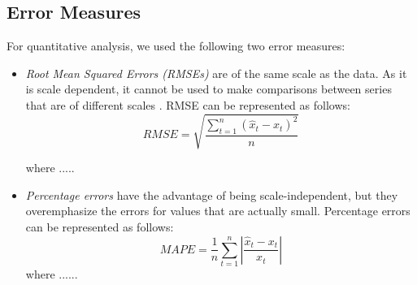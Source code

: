 \subsection{Error Measures}
For quantitative analysis, we used the following two error measures:

\begin{itemize}
\item \textit{Root Mean Squared Errors (RMSEs)} are of the same scale as the data. As it is scale dependent, it cannot be used to make comparisons between series that are of different scales \cite{Forecasting_OTexts}. RMSE can be represented as follows:
$$RMSE=\sqrt{\frac{\sum_{t=1}^{n}(\hat{x}_{t}-x_{t})^{2}}{n}}$$

where .....

\item \textit{Percentage errors} have the advantage of being scale-independent, but they overemphasize the errors for values that are actually small. Percentage errors can be represented as follows:
$$MAPE=\frac{1}{n}\sum_{t=1}^{n}\left | \frac{\hat{x}_{t}-x_{t}}{x_{t}} \right |$$
where ......
\end{itemize}